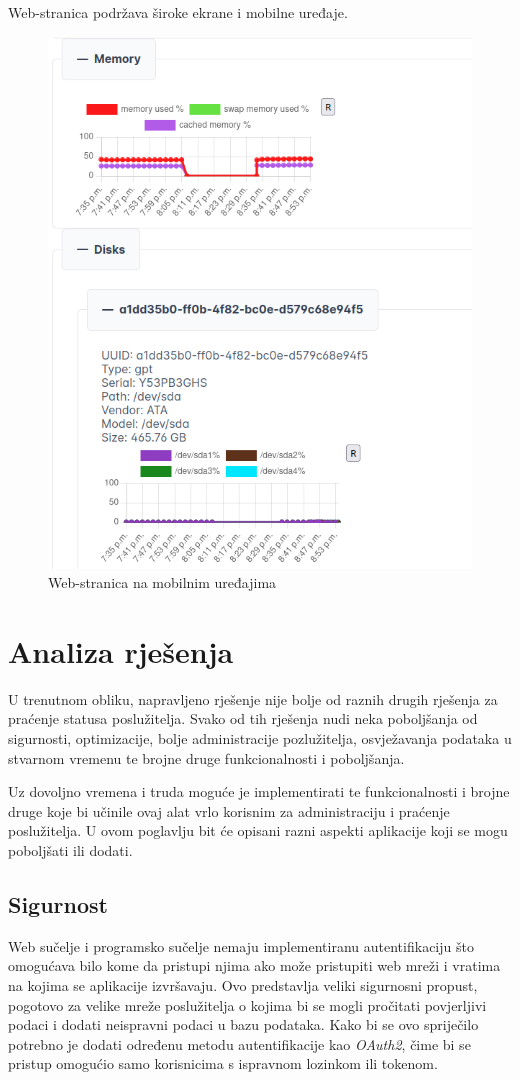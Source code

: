 \documentclass[zavrsnirad]{fer}
\begin{document}
Web-stranica podržava široke ekrane i mobilne uređaje.
\begin{figure}[htb]
	\centering
	\includegraphics[width=0.75\linewidth]{images/web_6.png} 
	\caption{Web-stranica na mobilnim uređajima}
\end{figure}
\FloatBarrier

\chapter{Analiza rješenja}
U trenutnom obliku, napravljeno rješenje nije bolje od raznih drugih rješenja za praćenje statusa poslužitelja. Svako od tih rješenja nudi neka poboljšanja od sigurnosti, optimizacije, bolje administracije pozlužitelja, osvježavanja podataka u stvarnom vremenu te brojne druge funkcionalnosti i poboljšanja.

Uz dovoljno vremena i truda moguće je implementirati te funkcionalnosti i brojne druge koje bi učinile ovaj alat vrlo korisnim za administraciju i praćenje poslužitelja. U ovom poglavlju bit će opisani razni aspekti aplikacije koji se mogu poboljšati ili dodati.

\section{Sigurnost}
Web sučelje i programsko sučelje nemaju implementiranu autentifikaciju što omogućava bilo kome da pristupi njima ako može pristupiti web mreži i vratima na kojima se aplikacije izvršavaju. Ovo predstavlja veliki sigurnosni propust, pogotovo za velike mreže poslužitelja o kojima bi se mogli pročitati povjerljivi podaci i dodati neispravni podaci u bazu podataka. Kako bi se ovo spriječilo potrebno je dodati određenu metodu autentifikacije kao \textit{OAuth2}, čime bi se pristup omogućio samo korisnicima s ispravnom lozinkom ili tokenom.
\end{document}
